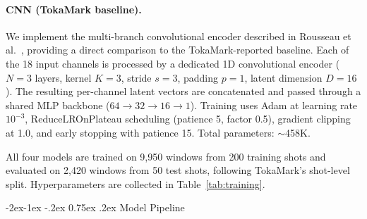 \documentclass[10pt,twocolumn]{article}
\makeatletter
\renewcommand\subsection{\@startsection{subsection}{2}{\z@}%
  {-2ex\@plus -1ex \@minus -.2ex}%
  {0.75ex \@plus .2ex}%
  {\normalfont\large\bfseries}}
\makeatother
\begin{document}
\paragraph{CNN (TokaMark baseline).}
We implement the multi-branch convolutional encoder described in
Rousseau et al.~\cite{rousseau2026tokamark}, providing a direct
comparison to the TokaMark-reported baseline. Each of the 18 input
channels is processed by a dedicated 1D convolutional encoder ($N=3$
layers, kernel $K=3$, stride $s=3$, padding $p=1$, latent dimension
$D=16$). The resulting per-channel latent vectors are concatenated and
passed through a shared MLP backbone ($64 \to 32 \to 16 \to 1$).
Training uses Adam at learning rate $10^{-3}$, ReduceLROnPlateau
scheduling (patience 5, factor 0.5), gradient clipping at 1.0, and
early stopping with patience 15. Total parameters: $\sim$458K.

All four models are trained on 9,950 windows from 200 training shots
and evaluated on 2,420 windows from 50 test shots, following TokaMark's
shot-level split. Hyperparameters are collected in Table~\ref{tab:training}.

\begin{table}[H]
\centering
\caption{Training hyperparameters for all four models.}
\label{tab:training}
\scriptsize
{}
\end{table}

\subsection{Model Pipeline}
\end{document}
